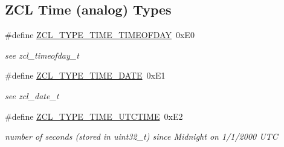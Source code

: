 \subsection*{Z\-C\-L Time (analog) Types}
\begin{DoxyCompactItemize}
\item 
\hypertarget{group__zcl__types_gaa6fdd0dcc77890280046eb1db9f79516}{\#define \hyperlink{group__zcl__types_gaa6fdd0dcc77890280046eb1db9f79516}{Z\-C\-L\-\_\-\-T\-Y\-P\-E\-\_\-\-T\-I\-M\-E\-\_\-\-T\-I\-M\-E\-O\-F\-D\-A\-Y}~0x\-E0}\label{group__zcl__types_gaa6fdd0dcc77890280046eb1db9f79516}

\begin{DoxyCompactList}\small\item\em see zcl\-\_\-timeofday\-\_\-t \end{DoxyCompactList}\item 
\hypertarget{group__zcl__types_gad5552b0825d941f0ccd7b1d797dc091b}{\#define \hyperlink{group__zcl__types_gad5552b0825d941f0ccd7b1d797dc091b}{Z\-C\-L\-\_\-\-T\-Y\-P\-E\-\_\-\-T\-I\-M\-E\-\_\-\-D\-A\-T\-E}~0x\-E1}\label{group__zcl__types_gad5552b0825d941f0ccd7b1d797dc091b}

\begin{DoxyCompactList}\small\item\em see zcl\-\_\-date\-\_\-t \end{DoxyCompactList}\item 
\hypertarget{group__zcl__types_ga8f678e97557cb052c0df4be97e9f1e82}{\#define \hyperlink{group__zcl__types_ga8f678e97557cb052c0df4be97e9f1e82}{Z\-C\-L\-\_\-\-T\-Y\-P\-E\-\_\-\-T\-I\-M\-E\-\_\-\-U\-T\-C\-T\-I\-M\-E}~0x\-E2}\label{group__zcl__types_ga8f678e97557cb052c0df4be97e9f1e82}

\begin{DoxyCompactList}\small\item\em number of seconds (stored in uint32\-\_\-t) since Midnight on 1/1/2000 U\-T\-C \end{DoxyCompactList}\end{DoxyCompactItemize}
